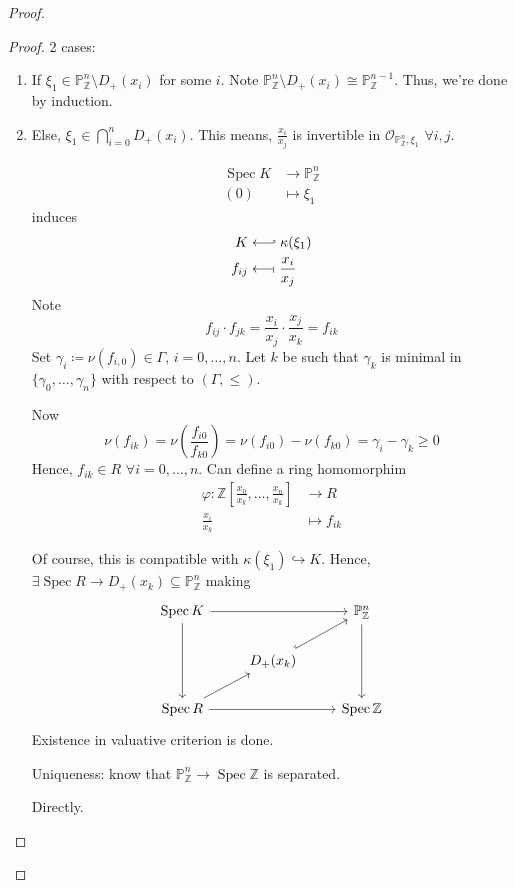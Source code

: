 \documentclass[12pt]{article}
\DeclareMathOperator{\Spec}{Spec}
\theoremstyle{definition}
\theoremstyle{remark}
\begin{document}
\begin{proof}
\begin{enumerate}[label=\arabic*)]
\begin{proof}
2 cases:

\begin{enumerate}[label=(\arabic*)]
\item If $\xi_1\in\mathbb{P}_{\mathbb{Z}}^n\setminus D_+(x_i)$ for some $i$. Note $\mathbb{P}_{\mathbb{Z}}^n\setminus D_+(x_i)\cong\mathbb{P}_{\mathbb{Z}}^{n-1}$. Thus, we're done by induction.

\item Else, $\xi_1\in\bigcap_{i=0}^nD_+(x_i)$. This means, $\frac{x_i}{x_j}$ is invertible in $\mathcal{O}_{\mathbb{P}_{\mathbb{Z}}^n,\xi_1}$ $\forall i,j$.

\begin{align*}
\Spec K&\longrightarrow\mathbb{P}_{\mathbb{Z}}^n\\
(0)&\longmapsto\xi_1
\end{align*}
induces
\begin{align*}
K&\longleftarrow\joinrel\rhook\kappa(\xi_1)\\
f_{ij}&\longleftarrow\!\shortmid\frac{x_i}{x_j}
\end{align*}
Note
\[f_{ij}\cdot f_{jk}=\frac{x_i}{x_j}\cdot\frac{x_j}{x_k}=f_{ik}\]
Set $\gamma_i\coloneqq\nu(f_{i,0})\in\Gamma$, $i=0,\ldots,n$. Let $k$ be such that $\gamma_k$ is minimal in $\{\gamma_0,\ldots,\gamma_n\}$ with respect to $(\Gamma,\leq)$.

Now
\[\nu(f_{ik})=\nu\left(\frac{f_{i0}}{f_{k0}}\right)=\nu(f_{i0})-\nu(f_{k0})=\gamma_i-\gamma_k\geq0\]
Hence, $f_{ik}\in R$ $\forall i=0,\ldots,n$. Can define a ring homomorphim
\begin{align*}
\varphi:\mathbb{Z}\left[\frac{x_0}{x_k},\ldots,\frac{x_n}{x_k}\right]&\longrightarrow R\\
\frac{x_i}{x_k}&\longmapsto f_{ik}
\end{align*}

Of course, this is compatible with $\kappa(\xi_1)\hookrightarrow K$. Hence, $\exists\Spec R\rightarrow D_+(x_k)\subseteq\mathbb{P}_{\mathbb{Z}}^n$ making
\[
\begin{tikzcd}
\Spec K\arrow[rr]\arrow[dd]&&\mathbb{P}_{\mathbb{Z}}^n\arrow[dd]\\
&D_+(x_k)\arrow[ru,hook]\\
\Spec R\arrow[ru]\arrow[rr]&&\Spec\mathbb{Z}
\end{tikzcd}
\]
Existence in valuative criterion is done.

Uniqueness: know that $\mathbb{P}_{\mathbb{Z}}^n\rightarrow\Spec\mathbb{Z}$ is separated.

Directly.
\end{enumerate}
\end{proof}
\end{enumerate}
\end{proof}
\end{document}
